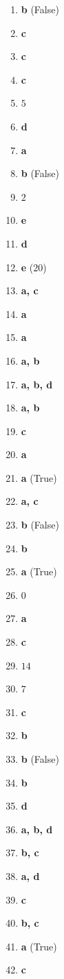 \documentclass[11pt,oneside]{article}
\begin{document}
\begin{enumerate}[label=\textbf{Q\arabic*.}, leftmargin=3em, itemsep=4pt]
  \item \textbf{b} (False)
  \item \textbf{c}
  \item \textbf{c}
  \item \textbf{c}
  \item $5$
  \item \textbf{d}
  \item \textbf{a}
  \item \textbf{b} (False)
  \item $2$
  \item \textbf{e}
  \item \textbf{d}
  \item \textbf{e} (20)
  \item \textbf{a, c}
  \item \textbf{a}
  \item \textbf{a}
  \item \textbf{a, b}
  \item \textbf{a, b, d}
  \item \textbf{a, b}
  \item \textbf{c}
  \item \textbf{a}
  \item \textbf{a} (True)
  \item \textbf{a, c}
  \item \textbf{b} (False)
  \item \textbf{b}
  \item \textbf{a} (True)
  \item $0$
  \item \textbf{a}
  \item \textbf{c}
  \item $14$
  \item $7$
  \item \textbf{c}
  \item \textbf{b}
  \item \textbf{b} (False)
  \item \textbf{b}
  \item \textbf{d}
  \item \textbf{a, b, d}
  \item \textbf{b, c}
  \item \textbf{a, d}
  \item \textbf{c}
  \item \textbf{b, c}
  \item \textbf{a} (True)
  \item \textbf{c}

\end{enumerate}
\end{document}
